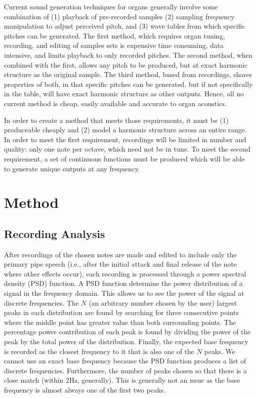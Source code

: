 \documentclass{article}
\begin{document}
Current sound generation techniques for organs generally involve some combination of (1) playback of pre-recorded samples (2) sampling frequency manipulation to adjust perceived pitch, and (3) wave tables from which specific pitches can be generated. The first method, which requires organ tuning, recording, and editing of samples sets is expensive time consuming, data intensive, and limits playback to only recorded pitches. The second method, when combined with the first, allows any pitch to be produced, but at exact harmonic structure as the original sample. The third method, based from recordings, shares properties of both, in that specific pitches can be generated, but if not specifically in the table, will have exact harmonic structure as other outputs. Hence, all no current method is cheap, easily available and accurate to organ acoustics.

In order to create a method that meets those requirements, it must be (1) produceable cheaply and (2) model a harmonic structure across an entire range. In order to meet the first requirement, recordings will be limited in number and quality: only one note per octave, which need not be in tune. To meet the second requirement, a set of continuous functions must be produced which will be able to generate unique outputs at any frequency.

\section{Method}

\subsection{Recording Analysis}

After recordings of the chosen notes are made and edited to include only the primary pipe speech (i.e., after the initial attack and final release of the note where other effects occur), each recording is processed through a power spectral density (PSD) function. A PSD function determine the power distribution of a signal in the frequency domain. This allows us to see the power of the signal at discrete frequencies. The $N$ (an arbitrary number chosen by the user) largest peaks in each distribution are found by searching for three consecutive points where the middle point has greater value than both surrounding points. The percentage power contribution of each peak is found by dividing the power of the peak by the total power of the distribution. Finally, the expected base frequency is recorded as the closest frequency to it that is also one of the $N$ peaks. We cannot use an exact base frequency because the PSD function produces a list of discrete frequencies. Furthermore, the number of peaks chosen so that there is a close match (within 2Hz, generally). This is generally not an issue as the base frequency is almost always one of the first two peaks.
\end{document}
